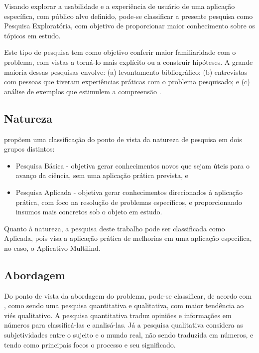 Visando explorar a usabilidade e a experiência de usuário de uma aplicação específica, com público alvo definido, pode-se classificar a presente pesquisa como Pesquisa Exploratória, com objetivo de proporcionar maior conhecimento 
sobre os tópicos em estudo.

Este tipo de pesquisa tem como objetivo conferir maior familiaridade com o problema, com vistas a torná-lo mais explícito ou a construir hipóteses. A grande maioria dessas pesquisas envolve: (a) levantamento 
bibliográfico; (b) 	entrevistas com pessoas que tiveram experiências práticas com o problema pesquisado; e (c) análise de exemplos que estimulem a compreensão \cite{gil2002}.

\subsection{Natureza}
\label{sec:Natureza}
 propõem uma classificação do ponto de vista da natureza de pesquisa em dois grupos distintos:

\begin{itemize}
	\item Pesquisa Básica - objetiva gerar conhecimentos novos que sejam úteis para o avanço da ciência, sem uma aplicação prática prevista, e
	\item Pesquisa Aplicada - objetiva gerar conhecimentos direcionados à aplicação prática, com foco na resolução de problemas específicos, e 
	proporcionando insumos mais concretos sob o objeto em estudo.
\end{itemize}

Quanto à natureza, a pesquisa deste trabalho pode ser classificada como Aplicada, pois visa a aplicação prática de melhorias em uma aplicação específica, no caso, o Aplicativo Multilind.

\subsection{Abordagem}
\label{sec:Abordagem}
Do ponto de vista da abordagem do problema, pode-se classificar, de acordo com , como sendo uma pesquisa quantitativa e qualitativa, com maior tendência ao viés qualitativo. A pesquisa quantitativa traduz opiniões e informações em 
números para classificá-las e analisá-las. Já a pesquisa qualitativa considera as subjetividades entre o sujeito e o mundo real, não sendo traduzida em números, e tendo como principais focos o processo e seu significado.

